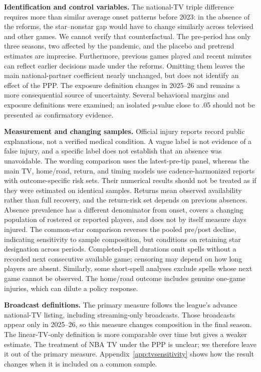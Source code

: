 \documentclass[11pt]{article}
\begin{document}
\noindent\textbf{Identification and control variables.} The national-TV triple difference requires more than similar average onset patterns before 2023: in the absence of the reforms, the star--nonstar gap would have to change similarly across televised and other games. We cannot verify that counterfactual. The pre-period has only three seasons, two affected by the pandemic, and the placebo and pretrend estimates are imprecise. Furthermore, previous games played and recent minutes can reflect earlier decisions made under the reforms. Omitting them leaves the main national-partner coefficient nearly unchanged, but does not identify an effect of the PPP. The exposure definition changes in 2025--26 and remains a more consequential source of uncertainty. Several behavioral margins and exposure definitions were examined; an isolated $p$-value close to .05 should not be presented as confirmatory evidence.\par
\noindent\textbf{Measurement and changing samples.} Official injury reports record public explanations, not a verified medical condition. A vague label is not evidence of a false injury, and a specific label does not establish that an absence was unavoidable. The wording comparison uses the latest-pre-tip panel, whereas the main TV, home/road, return, and timing models use cadence-harmonized reports with outcome-specific risk sets. Their numerical results should not be treated as if they were estimated on identical samples. Returns mean observed availability rather than full recovery, and the return-risk set depends on previous absences. Absence prevalence has a different denominator from onset, covers a changing population of rostered or reported players, and does not by itself measure days injured. The common-star comparison reverses the pooled pre/post decline, indicating sensitivity to sample composition, but conditions on retaining star designation across periods. Completed-spell durations omit spells without a recorded next consecutive available game; censoring may depend on how long players are absent. Similarly, some short-spell analyses exclude spells whose next game cannot be observed. The home/road outcome includes genuine one-game injuries, which can dilute a policy response.

\noindent\textbf{Broadcast definitions.} The primary measure follows the league's advance national-TV listing, including streaming-only broadcasts. Those broadcasts appear only in 2025--26, so this measure changes composition in the final season. The linear-TV-only definition is more comparable over time but gives a weaker estimate. The treatment of NBA TV under the PPP is unclear; we therefore leave it out of the primary measure. Appendix~\ref{app:tvsensitivity} shows how the result changes when it is included on a common sample.
\end{document}
